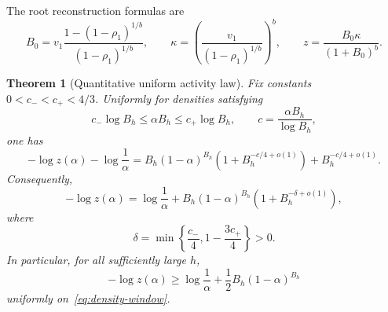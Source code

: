 \documentclass[11pt]{amsart}
\newtheorem{theorem}{Theorem}[section]
\theoremstyle{definition}
\begin{document}
The root reconstruction formulas are
\[
 B_0=v_1\frac{1-(1-\rho_1)^{1/b}}{(1-\rho_1)^{1/b}},
 \qquad
 \kappa=\left(\frac{v_1}{(1-\rho_1)^{1/b}}\right)^b,
 \qquad
 z=\frac{B_0\kappa}{(1+B_0)^b}.
\]

\begin{theorem}[Quantitative uniform activity law]\label{thm:activity-law}
Fix constants $0<c_-<c_+<4/3$.  Uniformly for densities satisfying
\begin{equation}\label{eq:density-window}
 c_-\log B_h\le\alpha B_h\le c_+\log B_h,
 \qquad
 c=\frac{\alpha B_h}{\log B_h},
\end{equation}
one has
\begin{equation}\label{eq:activity-additive-quantitative}
 -\log z(\alpha)-\log\frac1\alpha
 =B_h(1-\alpha)^{B_h}
  \left(1+B_h^{-c/4+o(1)}\right)
  +B_h^{-c/4+o(1)}.
\end{equation}
Consequently,
\begin{equation}\label{eq:activity-law}
 \boxed{
 -\log z(\alpha)
 =\log\frac1\alpha
 +B_h(1-\alpha)^{B_h}
 \left(1+B_h^{-\delta+o(1)}\right),
 }
\end{equation}
where
\begin{equation}\label{eq:activity-delta}
 \delta=\min\left\{\frac{c_-}{4},
 1-\frac{3c_+}{4}\right\}>0.
\end{equation}
In particular, for all sufficiently large $h$,
\begin{equation}\label{eq:activity-lower}
 -\log z(\alpha)
 \ge\log\frac1\alpha
 +\frac12B_h(1-\alpha)^{B_h}
\end{equation}
uniformly on~\eqref{eq:density-window}.
\end{theorem}
\end{document}
